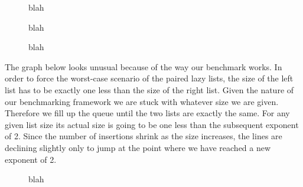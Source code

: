 \begin{figure}[htb]
\centering

\caption{blah}
\label{simple}
\end{figure}

\begin{figure}[htb]
\centering

\caption{blah}
\label{simple-high}
\end{figure}


\begin{figure}[htb]
\centering

\caption{blah}
\label{reuse-remove-2}
\end{figure}

The graph below looks unusual because of the way our benchmark works. In order to force the worst-case scenario of the paired lazy lists, the size of the left list has to be exactly one less than the size of the right list. Given the nature of our benchmarking framework we are stuck with whatever size we are given. Therefore we fill up the queue until the two lists are exactly the same. For any given list size its actual size is going to be one less than the subsequent exponent of 2. Since the number of insertions shrink as the size increases, the lines are declining slightly only to jump at the point where we have reached a new exponent of 2.


\begin{figure}[htb]
\centering

\caption{blah}
\label{reuse-remove-4}
\end{figure}

